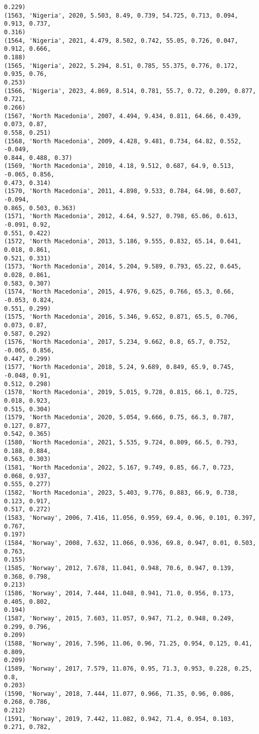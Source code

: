 \documentclass[11pt]{article}
\begin{document}
\begin{Verbatim}[commandchars=\\\{\}]
0.229)
(1563, 'Nigeria', 2020, 5.503, 8.49, 0.739, 54.725, 0.713, 0.094, 0.913, 0.737,
0.316)
(1564, 'Nigeria', 2021, 4.479, 8.502, 0.742, 55.05, 0.726, 0.047, 0.912, 0.666,
0.188)
(1565, 'Nigeria', 2022, 5.294, 8.51, 0.785, 55.375, 0.776, 0.172, 0.935, 0.76,
0.253)
(1566, 'Nigeria', 2023, 4.869, 8.514, 0.781, 55.7, 0.72, 0.209, 0.877, 0.721,
0.266)
(1567, 'North Macedonia', 2007, 4.494, 9.434, 0.811, 64.66, 0.439, 0.073, 0.87,
0.558, 0.251)
(1568, 'North Macedonia', 2009, 4.428, 9.481, 0.734, 64.82, 0.552, -0.049,
0.844, 0.488, 0.37)
(1569, 'North Macedonia', 2010, 4.18, 9.512, 0.687, 64.9, 0.513, -0.065, 0.856,
0.473, 0.314)
(1570, 'North Macedonia', 2011, 4.898, 9.533, 0.784, 64.98, 0.607, -0.094,
0.865, 0.503, 0.363)
(1571, 'North Macedonia', 2012, 4.64, 9.527, 0.798, 65.06, 0.613, -0.091, 0.92,
0.551, 0.422)
(1572, 'North Macedonia', 2013, 5.186, 9.555, 0.832, 65.14, 0.641, 0.018, 0.861,
0.521, 0.331)
(1573, 'North Macedonia', 2014, 5.204, 9.589, 0.793, 65.22, 0.645, 0.028, 0.861,
0.583, 0.307)
(1574, 'North Macedonia', 2015, 4.976, 9.625, 0.766, 65.3, 0.66, -0.053, 0.824,
0.551, 0.299)
(1575, 'North Macedonia', 2016, 5.346, 9.652, 0.871, 65.5, 0.706, 0.073, 0.87,
0.587, 0.292)
(1576, 'North Macedonia', 2017, 5.234, 9.662, 0.8, 65.7, 0.752, -0.065, 0.856,
0.447, 0.299)
(1577, 'North Macedonia', 2018, 5.24, 9.689, 0.849, 65.9, 0.745, -0.048, 0.91,
0.512, 0.298)
(1578, 'North Macedonia', 2019, 5.015, 9.728, 0.815, 66.1, 0.725, 0.018, 0.923,
0.515, 0.304)
(1579, 'North Macedonia', 2020, 5.054, 9.666, 0.75, 66.3, 0.787, 0.127, 0.877,
0.542, 0.365)
(1580, 'North Macedonia', 2021, 5.535, 9.724, 0.809, 66.5, 0.793, 0.188, 0.884,
0.563, 0.303)
(1581, 'North Macedonia', 2022, 5.167, 9.749, 0.85, 66.7, 0.723, 0.068, 0.937,
0.555, 0.277)
(1582, 'North Macedonia', 2023, 5.403, 9.776, 0.883, 66.9, 0.738, 0.123, 0.917,
0.517, 0.272)
(1583, 'Norway', 2006, 7.416, 11.056, 0.959, 69.4, 0.96, 0.101, 0.397, 0.767,
0.197)
(1584, 'Norway', 2008, 7.632, 11.066, 0.936, 69.8, 0.947, 0.01, 0.503, 0.763,
0.155)
(1585, 'Norway', 2012, 7.678, 11.041, 0.948, 70.6, 0.947, 0.139, 0.368, 0.798,
0.213)
(1586, 'Norway', 2014, 7.444, 11.048, 0.941, 71.0, 0.956, 0.173, 0.405, 0.802,
0.194)
(1587, 'Norway', 2015, 7.603, 11.057, 0.947, 71.2, 0.948, 0.249, 0.299, 0.796,
0.209)
(1588, 'Norway', 2016, 7.596, 11.06, 0.96, 71.25, 0.954, 0.125, 0.41, 0.809,
0.209)
(1589, 'Norway', 2017, 7.579, 11.076, 0.95, 71.3, 0.953, 0.228, 0.25, 0.8,
0.203)
(1590, 'Norway', 2018, 7.444, 11.077, 0.966, 71.35, 0.96, 0.086, 0.268, 0.786,
0.212)
(1591, 'Norway', 2019, 7.442, 11.082, 0.942, 71.4, 0.954, 0.103, 0.271, 0.782,

\end{Verbatim}
\end{document}
